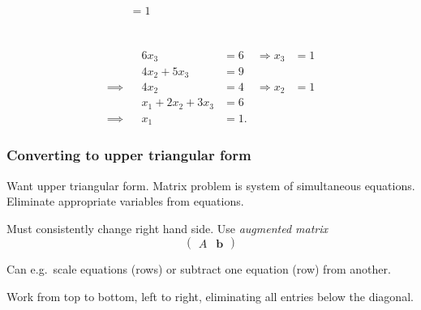 \documentclass{beamer}
\newcommand{\bb}{{\boldsymbol{b}}}
\begin{document}
\begin{frame}
\begin{overlayarea}{\textwidth}{0.35\textheight}
{\begin{align*}
{          = 1 } \\
        && \phantom{ x_1 + 2 x_2 + 3 x_3 } & \phantom{ = 6 } && \\
        \phantom{ \implies } && \phantom{ x_1 } & \phantom{ = 1. }
      \end{align*}
    }
    {
      \begin{align*}
        && {6 x_3} & {= 6} & {\Rightarrow x_3} & {= 1} \\
        && {4 x_2 + 5 x_3} & {= 9} && \\
        {\implies} && {4 x_2} & {= 4} & {\Rightarrow x_2} & {= 1} \\
        && {x_1 + 2 x_2 + 3 x_3} & {= 6} && \\
        {\implies} && {x_1} & {= 1.}
      \end{align*}
    }
  \end{overlayarea}

\end{frame}


\begin{frame}
  \frametitle{Converting to upper triangular form}
  
  Want upper triangular form. Matrix problem is 
  system of simultaneous equations. Eliminate appropriate variables
  from equations. \pause

  \vspace{2ex}

  Must consistently change right hand side. 
  Use \emph{augmented matrix}
  \begin{equation*}
    \left(
    \begin{array}{c|c}
      A & \bb
    \end{array}
    \right)
  \end{equation*}

  \vspace{1ex}

  Can e.g.\ scale equations (rows) or subtract one equation (row) from another.

  \vspace{2ex}

  Work from top to bottom, left to right, eliminating all entries
  below the diagonal.

\end{frame}
\end{document}
